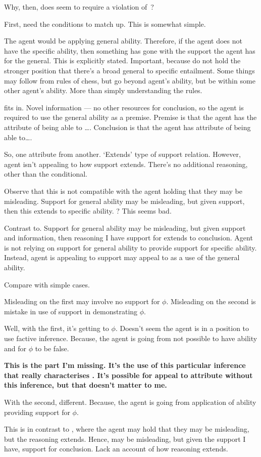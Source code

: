 \begin{note}[~\nI{} and \AR{}]
  Why, then, does \AR{} seem to require a violation of~\nI{}?

  First, need the conditions to match up.
  This is somewhat simple.

  The agent would be applying general ability.
  Therefore, if the agent does not have the specific ability, then something has gone with the support the agent has for the general.
  This is explicitly stated.
  Important, because do not hold the stronger position that there's a broad general to specific entailment.
  Some things may follow from rules of chess, but go beyond agent's ability, but be within some other agent's ability.
  More than simply understanding the rules.

  \AR{} fits in.
  Novel information --- no other resources for conclusion, so the agent is required to use the general ability as a premise.
  Premise is that the agent has the attribute of being able to \dots.
  Conclusion is that the agent has attribute of being able to\dots.

  So, one attribute from another.
  `Extends' type of support relation.
  However, agent isn't appealing to how support extends.
  There's no additional reasoning, other than the conditional.

  Observe that this is not compatible with the agent holding that they may be misleading.
  Support for general ability may be misleading, but given support, then this extends to specific ability.
  ? This seems bad.

  Contrast to.
  Support for general ability may be misleading, but given support and information, then reasoning I have support for extends to conclusion.
  Agent is not relying on support for general ability to provide support for specific ability.
  Instead, agent is appealing to support may appeal to as a use of the general ability.

  Compare with simple cases.
  


  Misleading on the first may involve no support for \(\phi\).
  Misleading on the second is mistake in use of support in demonstrating \(\phi\).
  {
    \color{green}
    Well, with the first, it's getting to \(\phi\).
    Doesn't seem the agent is in a position to use factive inference.
    Because, the agent is going from not possible to have ability and for \(\phi\) to be false.

    \textbf{
      This is the part I'm missing.
      It's the use of this particular inference that really characterises \AR{}.
      It's possible for appeal to attribute without this inference, but that doesn't matter to me.
    }

    With the second, different.
    Because, the agent is going from application of ability providing support for \(\phi\).
  }

  {
    \color{red}
    This is in contrast to \WR{}, where the agent may hold that they may be misleading, but the reasoning extends.
    Hence, may be misleading, but given the support I have, support for conclusion.
    Lack an account of how reasoning extends.
  }
\end{note}

